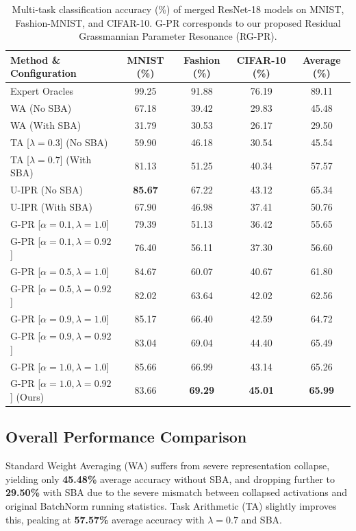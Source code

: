 \documentclass{article}
\theoremstyle{plain}
\theoremstyle{definition}
\theoremstyle{remark}
\begin{document}
\begin{table}[t]
\caption{Multi-task classification accuracy (\%) of merged ResNet-18 models on MNIST, Fashion-MNIST, and CIFAR-10. G-PR corresponds to our proposed Residual Grassmannian Parameter Resonance (RG-PR).}
\label{tab:results}
\vskip 0.15in
\begin{center}
\begin{small}
\begin{sc}
\begin{tabular}{lcccc}
\toprule
Method \& Configuration & MNIST (\%) & Fashion (\%) & CIFAR-10 (\%) & Average (\%) \\
\midrule
Expert Oracles & 99.25 & 91.88 & 76.19 & 89.11 \\
\midrule
WA (No SBA) & 67.18 & 39.42 & 29.83 & 45.48 \\
WA (With SBA) & 31.79 & 30.53 & 26.17 & 29.50 \\
TA [$\lambda=0.3$] (No SBA) & 59.90 & 46.18 & 30.54 & 45.54 \\
TA [$\lambda=0.7$] (With SBA) & 81.13 & 51.25 & 40.34 & 57.57 \\
U-IPR (No SBA) & \textbf{85.67} & 67.22 & 43.12 & 65.34 \\
U-IPR (With SBA) & 67.90 & 46.98 & 37.41 & 50.76 \\
\midrule
G-PR [$\alpha=0.1, \lambda=1.0$] & 79.39 & 51.13 & 36.42 & 55.65 \\
G-PR [$\alpha=0.1, \lambda=0.92$] & 76.40 & 56.11 & 37.30 & 56.60 \\
G-PR [$\alpha=0.5, \lambda=1.0$] & 84.67 & 60.07 & 40.67 & 61.80 \\
G-PR [$\alpha=0.5, \lambda=0.92$] & 82.02 & 63.64 & 42.02 & 62.56 \\
G-PR [$\alpha=0.9, \lambda=1.0$] & 85.17 & 66.40 & 42.59 & 64.72 \\
G-PR [$\alpha=0.9, \lambda=0.92$] & 83.04 & 69.04 & 44.40 & 65.49 \\
G-PR [$\alpha=1.0, \lambda=1.0$] & 85.66 & 66.99 & 43.14 & 65.26 \\
G-PR [$\alpha=1.0, \lambda=0.92$] (Ours) & 83.66 & \textbf{69.29} & \textbf{45.01} & \textbf{65.99} \\
\bottomrule
\end{tabular}
\end{sc}
\end{small}
\end{center}
\vskip -0.1in
\end{table}

\subsection{Overall Performance Comparison}
Standard Weight Averaging (WA) suffers from severe representation collapse, yielding only \textbf{45.48\%} average accuracy without SBA, and dropping further to \textbf{29.50\%} with SBA due to the severe mismatch between collapsed activations and original BatchNorm running statistics. Task Arithmetic (TA) slightly improves this, peaking at \textbf{57.57\%} average accuracy with $\lambda = 0.7$ and SBA.
\end{document}
